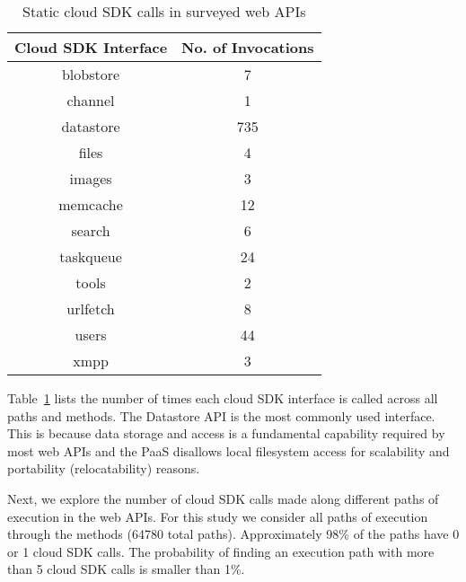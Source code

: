 \begin{table}[htdp]
\caption{Static cloud SDK calls in surveyed web APIs
\label{tab:sdk_call_counts}
}
\begin{center}
\begin{tabular}{|c|c|}
\hline
Cloud SDK Interface & No. of Invocations \\ \hline
blobstore & 7 \\ \hline
channel & 1 \\ \hline
datastore & 735 \\ \hline
files & 4 \\ \hline
images & 3 \\ \hline
memcache & 12 \\ \hline
search & 6 \\ \hline
taskqueue & 24 \\ \hline
tools & 2 \\ \hline
urlfetch & 8 \\ \hline
users & 44 \\ \hline
xmpp & 3 \\ \hline
\end{tabular}
\end{center}
\vspace{-0.2in}
\end{table}

Table~\ref{tab:sdk_call_counts} lists the number of times each cloud 
SDK interface is called across all paths and methods.
The Datastore API is the most commonly used interface.
This is because data storage and access is a fundamental 
capability required by most web APIs and the PaaS
disallows local filesystem
access for scalability and portability (relocatability) reasons.


Next, we explore the number of cloud SDK calls made along 
different paths of execution in the web APIs. For this study
we consider all paths of execution through the methods (64780 total paths). 
Approximately 98\% of the paths have 0 or 1 cloud SDK calls. 
The probability of finding an execution path with more than
5 cloud SDK calls is smaller than 1\%.

